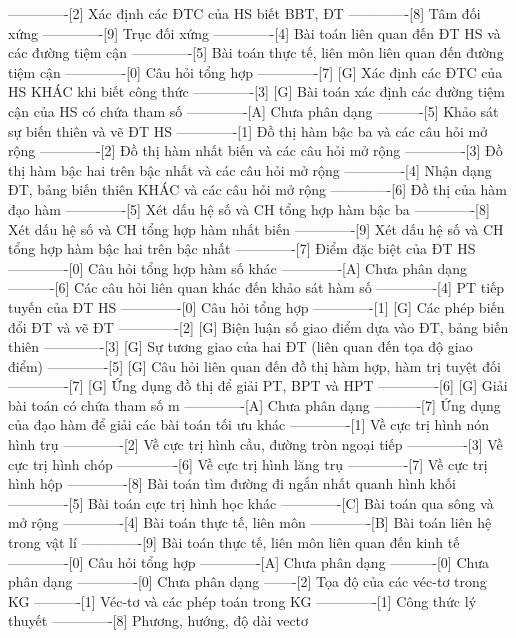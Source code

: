 -------------[2] Xác định các ĐTC của HS biết BBT, ĐT
-------------[8] Tâm đối xứng
-------------[9] Trục đối xứng
-------------[4] Bài toán liên quan đến ĐT HS và các đường tiệm cận
-------------[5] Bài toán thực tế, liên môn liên quan đến đường tiệm cận
-------------[0] Câu hỏi tổng hợp
-------------[7] [G] Xác định các ĐTC của HS KHÁC khi biết công thức
-------------[3] [G] Bài toán xác định các đường tiệm cận của HS có chứa tham số
-------------[A] Chưa phân dạng
----------[5] Khảo sát sự biến thiên và vẽ ĐT HS
-------------[1] Đồ thị hàm bậc ba và các câu hỏi mở rộng
-------------[2] Đồ thị hàm nhất biến và các câu hỏi mở rộng
-------------[3] Đồ thị hàm bậc hai trên bậc nhất và các câu hỏi mở rộng
-------------[4] Nhận dạng ĐT, bảng biến thiên KHÁC và các câu hỏi mở rộng
-------------[6] Đồ thị của hàm đạo hàm
-------------[5] Xét dấu hệ số và CH tổng hợp hàm bậc ba
-------------[8] Xét dấu hệ số và CH tổng hợp hàm nhất biến
-------------[9] Xét dấu hệ số và CH tổng hợp hàm bậc hai trên bậc nhất
-------------[7] Điểm đặc biệt của ĐT HS
-------------[0] Câu hỏi tổng hợp hàm số khác
-------------[A] Chưa phân dạng
----------[6] Các câu hỏi liên quan khác đến khảo sát hàm số
-------------[4] PT tiếp tuyến của ĐT HS
-------------[0] Câu hỏi tổng hợp
-------------[1] [G] Các phép biến đổi ĐT và vẽ ĐT
-------------[2] [G] Biện luận số giao điểm dựa vào ĐT, bảng biến thiên
-------------[3] [G] Sự tương giao của hai ĐT (liên quan đến tọa độ giao điểm)
-------------[5] [G] Câu hỏi liên quan đến đồ thị hàm hợp, hàm trị tuyệt đối
-------------[7] [G] Ứng dụng đồ thị để giải PT, BPT và HPT
-------------[6] [G] Giải bài toán có chứa tham số m
-------------[A] Chưa phân dạng
----------[7] Ứng dụng của đạo hàm để giải các bài toán tối ưu khác
-------------[1] Về cực trị hình nón hình trụ
-------------[2] Về cực trị hình cầu, đường tròn ngoại tiếp 
-------------[3] Về cực trị hình chóp
-------------[6] Về cực trị hình lăng trụ
-------------[7] Về cực trị hình hộp
-------------[8] Bài toán tìm đường đi ngắn nhất quanh hình khối
-------------[5] Bài toán cực trị hình học khác
-------------[C] Bài toán qua sông và mở rộng
-------------[4] Bài toán thực tế, liên môn
-------------[B] Bài toán liên hệ trong vật lí
-------------[9] Bài toán thực tế, liên môn liên quan đến kinh tế
-------------[0] Câu hỏi tổng hợp
-------------[A] Chưa phân dạng
----------[0] Chưa phân dạng
-------------[0] Chưa phân dạng
-------[2] Tọa độ của các véc-tơ trong KG
----------[1] Véc-tơ và các phép toán trong KG
-------------[1] Công thức lý thuyết
-------------[8] Phương, hướng, độ dài vectơ
